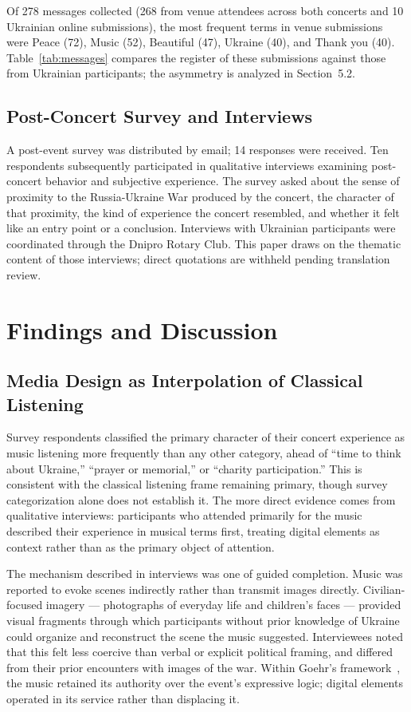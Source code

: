 \documentclass[sigconf,anonymous,review]{acmart}
\begin{document}
Of 278 messages collected (268 from venue attendees across both concerts and 10 Ukrainian
online submissions), the most frequent terms in venue submissions were Peace (72),
Music (52), Beautiful (47), Ukraine (40), and Thank you (40).
Table~\ref{tab:messages} compares the register of these submissions against those from
Ukrainian participants; the asymmetry is analyzed in Section~5.2.

\subsection{Post-Concert Survey and Interviews}

A post-event survey was distributed by email; 14 responses were received.
Ten respondents subsequently participated in qualitative interviews examining post-concert
behavior and subjective experience.
The survey asked about the sense of proximity to the Russia-Ukraine War produced by the
concert, the character of that proximity, the kind of experience the concert resembled, and
whether it felt like an entry point or a conclusion.
Interviews with Ukrainian participants were coordinated through the Dnipro Rotary Club.
This paper draws on the thematic content of those interviews; direct quotations are
withheld pending translation review.

\section{Findings and Discussion}

\subsection{Media Design as Interpolation of Classical Listening}

Survey respondents classified the primary character of their concert experience as music
listening more frequently than any other category, ahead of ``time to think about
Ukraine,'' ``prayer or memorial,'' or ``charity participation.''
This is consistent with the classical listening frame remaining primary, though survey
categorization alone does not establish it.
The more direct evidence comes from qualitative interviews: participants who attended
primarily for the music described their experience in musical terms first, treating digital
elements as context rather than as the primary object of attention.

The mechanism described in interviews was one of guided completion.
Music was reported to evoke scenes indirectly rather than transmit images directly.
Civilian-focused imagery --- photographs of everyday life and children's faces --- provided
visual fragments through which participants without prior knowledge of Ukraine could
organize and reconstruct the scene the music suggested.
Interviewees noted that this felt less coercive than verbal or explicit political framing,
and differed from their prior encounters with images of the war.
Within Goehr's framework~\cite{Goehr1992}, the music retained its authority over the
event's expressive logic; digital elements operated in its service rather than displacing it.
\end{document}

